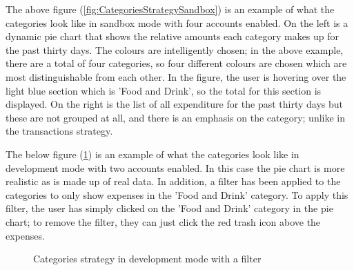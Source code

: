 The above figure (\ref{fig:CategoriesStrategySandbox}) is an example of what the categories look like in sandbox mode with four accounts enabled. On the left is a dynamic pie chart that shows the relative amounts each category makes up for the past thirty days. The colours are intelligently chosen; in the above example, there are a total of four categories, so four different colours are chosen which are most distinguishable from each other. In the figure, the user is hovering over the light blue section which is 'Food and Drink', so the total for this section is displayed. On the right is the list of all expenditure for the past thirty days but these are not grouped at all, and there is an emphasis on the category; unlike in the transactions strategy.

The below figure (\ref{fig:CategoriesStrategyDevelopment}) is an example of what the categories look like in development mode with two accounts enabled. In this case the pie chart is more realistic as is made up of real data. In addition, a filter has been applied to the categories to only show expenses in the 'Food and Drink' category. To apply this filter, the user has simply clicked on the 'Food and Drink' category in the pie chart; to remove the filter, they can just click the red trash icon above the expenses.

\begin{figure}[H]
	\centering
	\caption{Categories strategy in development mode with a filter}
	\label{fig:CategoriesStrategyDevelopment}
\end{figure}

